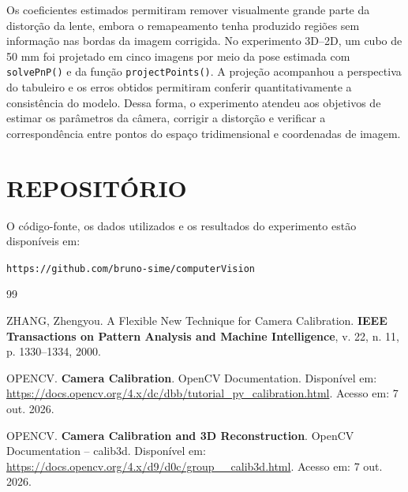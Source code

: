 \documentclass[12pt, a4paper, twoside, chapter=TITLE, subsection=TITLE, section=TITLE, subsubsection=TITLE, subsubsubsection=TITLE, english, german, brazil]{abntex2}
\begin{document}
Os coeficientes estimados permitiram remover visualmente grande parte da distorção da lente, embora o remapeamento tenha produzido regiões sem informação nas bordas da imagem corrigida. No experimento 3D--2D, um cubo de 50 mm foi projetado em cinco imagens por meio da pose estimada com \texttt{solvePnP()} e da função \texttt{projectPoints()}. A projeção acompanhou a perspectiva do tabuleiro e os erros obtidos permitiram conferir quantitativamente a consistência do modelo. Dessa forma, o experimento atendeu aos objetivos de estimar os parâmetros da câmera, corrigir a distorção e verificar a correspondência entre pontos do espaço tridimensional e coordenadas de imagem.

\chapter{REPOSITÓRIO}
O código-fonte, os dados utilizados e os resultados do experimento estão disponíveis em:

\begin{center}
\texttt{https://github.com/bruno-sime/computerVision}
\end{center}

\postextual
\begin{thebibliography}{99}

ZHANG, Zhengyou. A Flexible New Technique for Camera Calibration. \textbf{IEEE Transactions on Pattern Analysis and Machine Intelligence}, v. 22, n. 11, p. 1330--1334, 2000.

OPENCV. \textbf{Camera Calibration}. OpenCV Documentation. Disponível em: \url{https://docs.opencv.org/4.x/dc/dbb/tutorial_py_calibration.html}. Acesso em: 7 out. 2026.

OPENCV. \textbf{Camera Calibration and 3D Reconstruction}. OpenCV Documentation -- calib3d. Disponível em: \url{https://docs.opencv.org/4.x/d9/d0c/group__calib3d.html}. Acesso em: 7 out. 2026.

\end{thebibliography}
\end{document}
